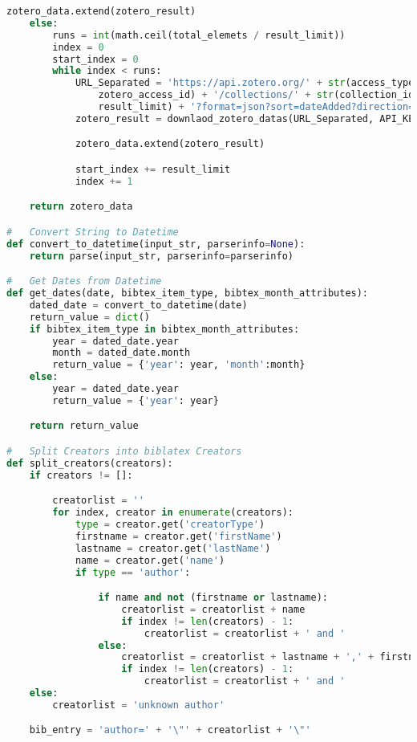 \begin{lstlisting}[language=python, caption=Python LaTex - zotero.py - Zotero BibLaTex Importer,captionpos=b,label={lst:zotero},breaklines=true]
        zotero_data.extend(zotero_result)
    else:
        runs = int(math.ceil(total_elemets / result_limit))
        index = 0
        start_index = 0
        while index < runs:
            URL_Separated = 'https://api.zotero.org/' + str(access_type) + '/' + str(
                zotero_access_id) + '/collections/' + str(collection_id) + '/items?limit=' + str(
                result_limit) + '?format=json?sort=dateAdded?direction=asc' + '&start=' + str(start_index)
            zotero_result = downlaod_zotero_datas(URL_Separated, API_KEY)

            zotero_data.extend(zotero_result)

            start_index += result_limit
            index += 1

    return zotero_data

#   Convert String to Datetime
def convert_to_datetime(input_str, parserinfo=None):
    return parse(input_str, parserinfo=parserinfo)

#   Get Dates from Datetime
def get_dates(date, bibtex_item_type, bibtex_month_attributes):
    dated_date = convert_to_datetime(date)
    return_value = dict()
    if bibtex_item_type in bibtex_month_attributes:
        year = dated_date.year
        month = dated_date.month
        return_value = {'year': year, 'month':month}
    else:
        year = dated_date.year
        return_value = {'year': year}

    return return_value

#   Split Creators into biblatex Creators
def split_creators(creators):
    if creators != []:

        creatorlist = ''
        for index, creator in enumerate(creators):
            type = creator.get('creatorType')
            firstname = creator.get('firstName')
            lastname = creator.get('lastName')
            name = creator.get('name')
            if type == 'author':

                if name and not (firstname or lastname):
                    creatorlist = creatorlist + name
                    if index != len(creators) - 1:
                        creatorlist = creatorlist + ' and '
                else:
                    creatorlist = creatorlist + lastname + ',' + firstname
                    if index != len(creators) - 1:
                        creatorlist = creatorlist + ' and '
    else:
        creatorlist = 'unknown author'

    bib_entry = 'author=' + '\"' + creatorlist + '\"'


\end{lstlisting}
